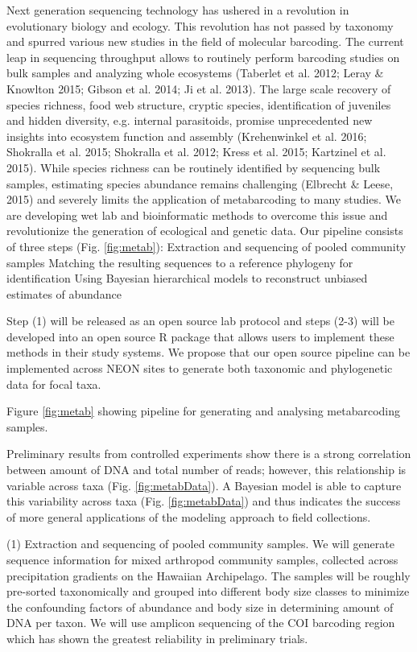 \documentclass[11pt]{article}
\makeatletter
\renewcommand{\paragraph}{\@startsection{paragraph}{4}{\z@}
  {1ex \@plus 1ex \@minus .2ex}{-1em}
  {\normalfont\normalsize\it}
}
\makeatother
\begin{document}
Next generation sequencing technology has ushered in a revolution in evolutionary biology and ecology. This revolution has not passed by taxonomy and spurred various new studies in the field of molecular barcoding. The current leap in sequencing throughput allows to routinely perform barcoding studies on bulk samples and analyzing whole ecosystems (Taberlet et al. 2012; Leray & Knowlton 2015; Gibson et al. 2014; Ji et al. 2013). The large scale recovery of species richness, food web structure, cryptic species, identification of juveniles and hidden diversity, e.g. internal parasitoids, promise unprecedented new insights into ecosystem function and assembly (Krehenwinkel et al. 2016; Shokralla et al. 2015; Shokralla et al. 2012; Kress et al. 2015; Kartzinel et al. 2015). While species richness can be routinely identified by sequencing bulk samples, estimating species abundance remains challenging (Elbrecht & Leese, 2015) and severely limits the application of metabarcoding to many studies. We are developing wet lab and bioinformatic methods to overcome this issue and revolutionize the generation of ecological and genetic data. Our pipeline consists of three steps (Fig. \ref{fig:metab}):
Extraction and sequencing of pooled community samples
Matching the resulting sequences to a reference phylogeny for identification
Using Bayesian hierarchical models to reconstruct unbiased estimates of abundance

Step (1) will be released as an open source lab protocol and steps (2-3) will be developed into an open source R package that allows users to implement these methods in their study systems.  We propose that our open source pipeline can be implemented across NEON sites to generate both taxonomic and phylogenetic data for focal taxa.


Figure \ref{fig:metab} showing pipeline for generating and analysing metabarcoding samples.

Preliminary results from controlled experiments show there is a strong correlation between amount of DNA and total number of reads; however, this relationship is variable across taxa (Fig. \ref{fig:metabData}). A Bayesian model is able to capture this variability across taxa (Fig. \ref{fig:metabData}) and thus indicates the success of more general applications of the modeling approach to field collections. 

\paragraph{(1) Extraction and sequencing of pooled community samples.}
We will generate sequence information for mixed arthropod community samples, collected across precipitation gradients on the Hawaiian Archipelago. The samples will be roughly pre-sorted taxonomically and grouped into different body size classes to minimize the confounding factors of abundance and body size in determining amount of DNA per taxon. We will use amplicon sequencing of the COI barcoding region \citep{} which has shown the greatest reliability in preliminary trials.
\end{document}
